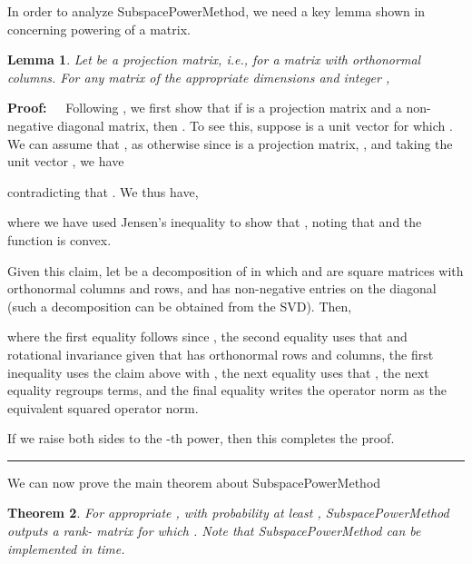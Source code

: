 \documentclass[11pt]{article}
\newtheorem{theorem}{Theorem}
\newtheorem{lemma}[theorem]{Lemma}
\newenvironment{proof}{\begin{trivlist} \item {\bf Proof:~~}}
  {\qed\end{trivlist}}
\def\qed{\hfill\rule{2mm}{2mm}}
\begin{document}
In order to analyze {\sf SubspacePowerMethod}, we need a key lemma shown in \cite{HMT} concerning powering of a matrix.
\begin{lemma}\label{lem:tropp}
Let  be a projection matrix, i.e.,  for a matrix  with orthonormal columns. For any matrix  of
the appropriate dimensions and integer ,

\end{lemma}
\begin{proof}
Following \cite{HMT}, we first show that if  is a projection matrix and  a non-negative diagonal matrix,
then . To see this, suppose  is a unit vector for which
. We can assume that , as otherwise since  is a projection matrix,
, and taking the unit vector , we have

contradicting that . We thus have,

where we have used Jensen's inequality to show that , noting
that  and the function  is convex.

Given this claim, let  be a decomposition of 
in which  and  are square matrices with orthonormal columns and rows, 
and  has non-negative entries on the diagonal (such a decomposition can be obtained
from the SVD). Then,

where the first equality follows since ,
the second equality uses that  and rotational
invariance given that  has orthonormal rows and columns, the first inequality
uses the claim
above with , the next equality uses that , the next equality regroups terms, and the final equality
writes the operator norm as the equivalent squared operator norm. 

If we raise both sides to the -th power, then this completes the proof. 
\end{proof}
We can now prove the main theorem about {\sf SubspacePowerMethod}
\begin{theorem}\label{thm:tropp}
For appropriate , 
with probability at least , {\sf SubspacePowerMethod} outputs a rank- matrix  for which
.
Note that {\sf SubspacePowerMethod} can be implemented in  time. 
\end{theorem}
\end{document}
